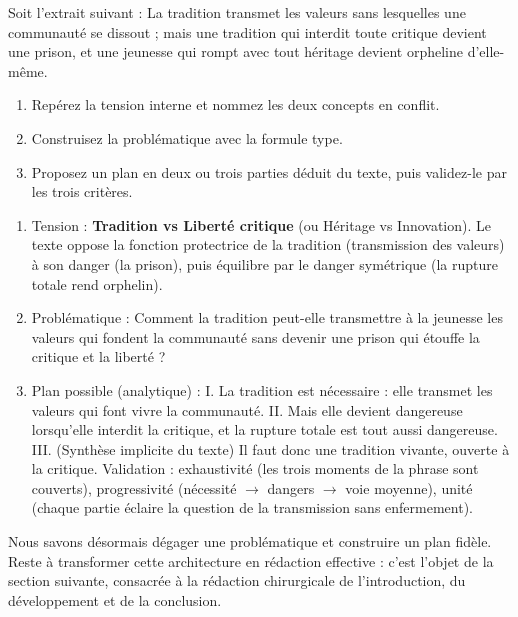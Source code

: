 \documentclass[11pt]{article}
\begin{document}
\begin{exercice}
Soit l'extrait suivant : \og La tradition transmet les valeurs sans lesquelles une communauté se dissout ; mais une tradition qui interdit toute critique devient une prison, et une jeunesse qui rompt avec tout héritage devient orpheline d'elle-même. \fg
\begin{enumerate}
\item Repérez la tension interne et nommez les deux concepts en conflit.
\item Construisez la problématique avec la formule type.
\item Proposez un plan en deux ou trois parties déduit du texte, puis validez-le par les trois critères.
\end{enumerate}
\end{exercice}

\begin{corrige}[Exercice]
\begin{enumerate}
\item Tension : \textbf{Tradition vs Liberté critique} (ou Héritage vs Innovation). Le texte oppose la fonction protectrice de la tradition (transmission des valeurs) à son danger (la prison), puis équilibre par le danger symétrique (la rupture totale rend orphelin).
\item Problématique : \og Comment la tradition peut-elle transmettre à la jeunesse les valeurs qui fondent la communauté sans devenir une prison qui étouffe la critique et la liberté ? \fg
\item Plan possible (analytique) : I. La tradition est nécessaire : elle transmet les valeurs qui font vivre la communauté. II. Mais elle devient dangereuse lorsqu'elle interdit la critique, et la rupture totale est tout aussi dangereuse. III. (Synthèse implicite du texte) Il faut donc une tradition vivante, ouverte à la critique. Validation : exhaustivité (les trois moments de la phrase sont couverts), progressivité (nécessité $\rightarrow$ dangers $\rightarrow$ voie moyenne), unité (chaque partie éclaire la question de la transmission sans enfermement).
\end{enumerate}
\end{corrige}

Nous savons désormais dégager une problématique et construire un plan fidèle. Reste à transformer cette architecture en rédaction effective : c'est l'objet de la section suivante, consacrée à la rédaction chirurgicale de l'introduction, du développement et de la conclusion.
\end{document}
